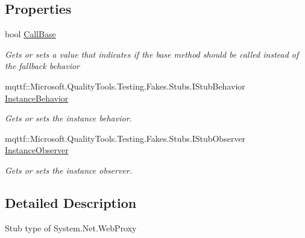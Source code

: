 \subsection*{Properties}
\begin{DoxyCompactItemize}
\item 
bool \hyperlink{class_system_1_1_net_1_1_fakes_1_1_stub_web_proxy_a81506cd18957c5c7a3bd6313d2e2574a}{Call\-Base}
\begin{DoxyCompactList}\small\item\em Gets or sets a value that indicates if the base method should be called instead of the fallback behavior\end{DoxyCompactList}\item 
mqttf\-::\-Microsoft.\-Quality\-Tools.\-Testing.\-Fakes.\-Stubs.\-I\-Stub\-Behavior \hyperlink{class_system_1_1_net_1_1_fakes_1_1_stub_web_proxy_a946434773632126b52514aab2db7b7ed}{Instance\-Behavior}
\begin{DoxyCompactList}\small\item\em Gets or sets the instance behavior.\end{DoxyCompactList}\item 
mqttf\-::\-Microsoft.\-Quality\-Tools.\-Testing.\-Fakes.\-Stubs.\-I\-Stub\-Observer \hyperlink{class_system_1_1_net_1_1_fakes_1_1_stub_web_proxy_a350da33c61ca314b1808d604bedb5527}{Instance\-Observer}
\begin{DoxyCompactList}\small\item\em Gets or sets the instance observer.\end{DoxyCompactList}\end{DoxyCompactItemize}


\subsection{Detailed Description}
Stub type of System.\-Net.\-Web\-Proxy



